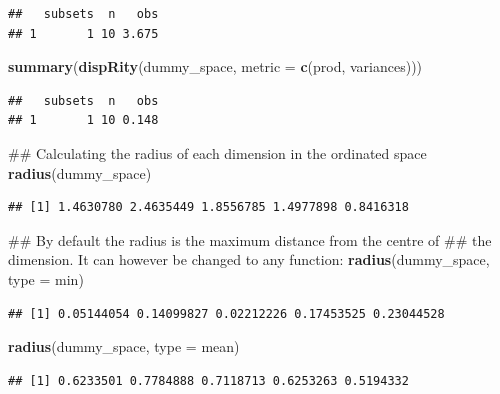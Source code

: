 \documentclass[]{book}
\newenvironment{Shaded}{\begin{snugshade}}{\end{snugshade}}
\newcommand{\KeywordTok}[1]{\textcolor[rgb]{0.13,0.29,0.53}{\textbf{#1}}}
\newcommand{\DataTypeTok}[1]{\textcolor[rgb]{0.13,0.29,0.53}{#1}}
\newcommand{\NormalTok}[1]{#1}
\theoremstyle{definition}
\theoremstyle{definition}
\theoremstyle{remark}
\begin{document}
\begin{verbatim}
##   subsets  n   obs
## 1       1 10 3.675
\end{verbatim}

\begin{Shaded}
\begin{Highlighting}[]
\KeywordTok{summary}\NormalTok{(}\KeywordTok{dispRity}\NormalTok{(dummy_space, }\DataTypeTok{metric =} \KeywordTok{c}\NormalTok{(prod, variances)))}
\end{Highlighting}
\end{Shaded}

\begin{verbatim}
##   subsets  n   obs
## 1       1 10 0.148
\end{verbatim}

\begin{Shaded}
\begin{Highlighting}[]
\NormalTok{## Calculating the radius of each dimension in the ordinated space}
\KeywordTok{radius}\NormalTok{(dummy_space)}
\end{Highlighting}
\end{Shaded}

\begin{verbatim}
## [1] 1.4630780 2.4635449 1.8556785 1.4977898 0.8416318
\end{verbatim}

\begin{Shaded}
\begin{Highlighting}[]
\NormalTok{## By default the radius is the maximum distance from the centre of}
\NormalTok{## the dimension. It can however be changed to any function:}
\KeywordTok{radius}\NormalTok{(dummy_space, }\DataTypeTok{type =}\NormalTok{ min)}
\end{Highlighting}
\end{Shaded}

\begin{verbatim}
## [1] 0.05144054 0.14099827 0.02212226 0.17453525 0.23044528
\end{verbatim}

\begin{Shaded}
\begin{Highlighting}[]
\KeywordTok{radius}\NormalTok{(dummy_space, }\DataTypeTok{type =}\NormalTok{ mean)}
\end{Highlighting}
\end{Shaded}

\begin{verbatim}
## [1] 0.6233501 0.7784888 0.7118713 0.6253263 0.5194332
\end{verbatim}
\end{document}
